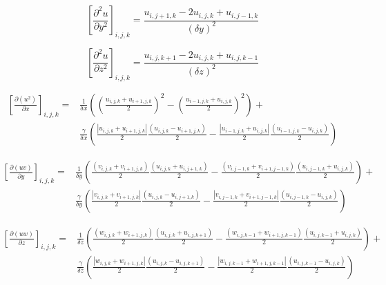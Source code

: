 \documentclass{article}%
\begin{document}
\begin{equation}
\left[\frac{\partial^2 u}{\partial y^2}\right]_{i,j,k} =
\frac{u_{i,j+1,k} - 2u_{i,j,k} + u_{i,j-1,k}}{(\delta y)^2}
\end{equation}

\begin{equation}
\left[\frac{\partial^2 u}{\partial z^2}\right]_{i,j,k} =
\frac{u_{i,j,k+1} - 2u_{i,j,k} + u_{i,j,k-1}}{(\delta z)^2}
\end{equation}

\begin{equation}
\begin{split}
\left[\frac{\partial(u^2)}{\partial x}\right]_{i,j,k} = &
\frac{1}{\delta x}
\left(
	\left(\frac{u_{i,j,k}+u_{i+1,j,k}}{2}\right)^2 -
	\left(\frac{u_{i-1,j,k}+u_{i,j,k}}{2}\right)^2
\right) + \\
& \frac{\gamma}{\delta x}
\left(
	\frac{|u_{i,j,k}+u_{i+1,j,k}|}{2} \frac{(u_{i,j,k}-u_{i+1,j,k})}{2} -
	\frac{|u_{i-1,j,k}+u_{i,j,k}|}{2} \frac{(u_{i-1,j,k}-u_{i,j,k})}{2}
\right)
\end{split}
\end{equation}

\begin{equation}
\begin{split}
\left[\frac{\partial(uv)}{\partial y}\right]_{i,j,k} = &
\frac{1}{\delta y}
\left(
	\frac{(v_{i,j,k}+v_{i+1,j,k})}{2} \frac{(u_{i,j,k}+u_{i,j+1,k})}{2} -
	\frac{(v_{i,j-1,k}+v_{i+1,j-1,k})}{2} \frac{(u_{i,j-1,k}+u_{i,j,k})}{2}
\right) + \\
& \frac{\gamma}{\delta y}
\left(
	\frac{|v_{i,j,k}+v_{i+1,j,k}|}{2} \frac{(u_{i,j,k}-u_{i,j+1,k})}{2} -
	\frac{|v_{i,j-1,k}+v_{i+1,j-1,k}|}{2} \frac{(u_{i,j-1,k}-u_{i,j,k})}{2}
\right)
\end{split}
\end{equation}

\begin{equation}
\begin{split}
\left[\frac{\partial(uw)}{\partial z}\right]_{i,j,k} = &
\frac{1}{\delta z}
\left(
	\frac{(w_{i,j,k}+w_{i+1,j,k})}{2} \frac{(u_{i,j,k}+u_{i,j,k+1})}{2} -
	\frac{(w_{i,j,k-1}+w_{i+1,j,k-1})}{2} \frac{(u_{i,j,k-1}+u_{i,j,k})}{2}
\right) + \\
& \frac{\gamma}{\delta z}
\left(
	\frac{|w_{i,j,k}+w_{i+1,j,k}|}{2} \frac{(u_{i,j,k}-u_{i,j,k+1})}{2} -
	\frac{|w_{i,j,k-1}+w_{i+1,j,k-1}|}{2} \frac{(u_{i,j,k-1}-u_{i,j,k})}{2}
\right)
\end{split}
\end{equation}
\end{document}
